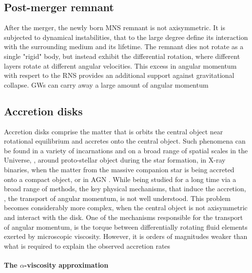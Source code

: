 
\subsection{Post-merger remnant}

After the merger, the newly born \ac{MNS} remnant is not axisymmetric. It is 
subjected to dynamical instabilities, that to the large degree define its interaction 
with the surrounding medium and its lifetime. The remnant dies not rotate as a 
single "rigid" body, but instead exhibit the differential rotation, where 
different layers rotate at different angular velocities. This excess in 
angular momentum with respert to the \ac{RNS} provides an additional support 
against gravitational collapse. \acp{GW} can carry away a large amount 
of angular momentum 


\subsection{Accretion disks}

Accretion disks comprise the matter that is orbits the central object near rotational 
equilibrium and accretes onto the central object. Such phenomena can be found in a variety of 
incarnations and on a broad range of spatial scales in the Universe, \eg, around proto-stellar
object during the star formation, in X-ray binaries, when the matter from the massive 
companion star is being accreted onto a compact object, or in \ac{AGN}
\cite{see e.g. Pringle, 1981; Balbus & Hawley, 1998; Spruit, 2010a, for reviews}.
While being studied for a long time via a broad range of methods, the key physical mechanisms, 
that induce the accretion, \ie, the transport of angular momentum, is not well understood.
This problem becomes considerably more complex, when the central object is not axisymmetric 
and interact with the disk. 
One of the mechanisms responsible for the transport of angular momentum, is the torque between
differentially rotating fluid elements exerted by microscopic viscosity. However, it is 
orders of magnitudes weaker than what is required to explain the observed accretion rates 
\cite{e.g. Lust, 1952} 

\paragraph{The $\alpha$-viscosity approximation}

